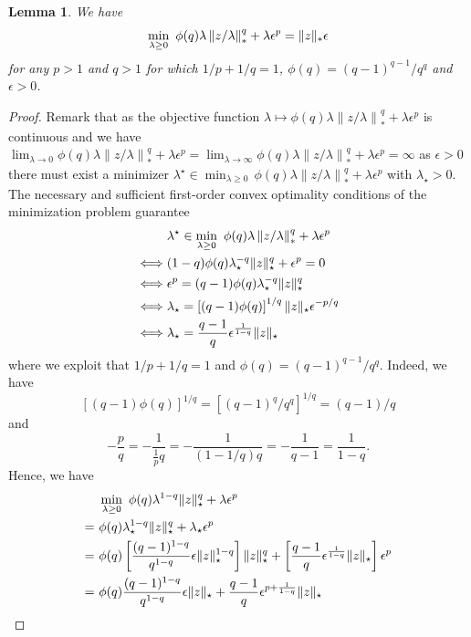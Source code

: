 \documentclass[12pt]{article}
\theoremstyle{thmstyleone}%
\newtheorem{lemma}[theorem]{Lemma}%
\theoremstyle{thmstyletwo}%
\theoremstyle{thmstylethree}%
\begin{document}
\begin{appendices}
\begin{lemma}
  \label{lemma:dual-helper}
  We have
  \[
    \min_{\lambda \geq 0} ~\phi(q)\lambda \left\|z/\lambda \right\|^q_* + \lambda \epsilon^p = \| z \|_*\epsilon
  \]
  for any $p>1$ and $q>1$ for which $1/p+1/q=1$, $\phi(q)=(q-1)^{q-1}/q^q$ and $\epsilon>0$.
\end{lemma}
\begin{proof}
  Remark that as the objective function $\lambda\mapsto \phi(q)\lambda \left\|z/\lambda \right\|^q_* + \lambda \epsilon^p$ is continuous and we have $\lim_{\lambda\to 0} \phi(q)\lambda \left\|z/\lambda \right\|^q_* + \lambda \epsilon^p = \lim_{\lambda\to\infty} \phi(q)\lambda \left\|z/\lambda \right\|^q_* + \lambda \epsilon^p=\infty$ as $\epsilon>0$ there must exist a minimizer $\lambda^\star\in \min_{\lambda \geq 0}\, \phi(q)\lambda \left\|z/\lambda \right\|^q_* + \lambda \epsilon^p$ with $\lambda_\star>0$.
The necessary and sufficient first-order convex optimality conditions of the minimization problem guarantee
\begin{align*}
  & \lambda^\star\in \min_{\lambda \geq 0} ~\phi(q)\lambda \left\|z/\lambda \right\|^q_* + \lambda \epsilon^p\\
  \iff & (1-q)\phi(q) \lambda_\star^{-q} \| z \|_\star^q + \epsilon^p = 0\\
  \iff & \epsilon^p = (q-1) \phi(q) \lambda_\star^{-q} \| z \|_\star^q \\
  \iff & \lambda_\star = \left[(q-1) \phi(q)\right]^{1/q} \| z \|_\star\epsilon^{-p/q}\\
  \iff & \lambda_\star = \frac{q-1}{q} \epsilon^{\frac{1}{1-q}} \| z \|_\star
\end{align*}
where we exploit that $1/p+1/q=1$ and $\phi(q)=(q-1)^{q-1}/q^q$. Indeed, we have
\[
  \left[(q-1) \phi(q)\right]^{1/q} = \left[(q-1)^{q}/q^q\right]^{1/q}= (q-1)/q
\]
and
\[
  -\frac{p}{q} = -\frac{1}{\frac{1}{p} q} = -\frac{1}{(1-1/q) q}=-\frac{1}{q-1}=\frac{1}{1-q}.
\]
Hence, we have
\begin{align*}
  & \min_{\lambda\geq 0} ~\phi(q) \lambda^{1-q} \norm{z}_\star^q+\lambda\epsilon^p\\
  = ~&\phi(q) \lambda_\star^{1-q} \norm{z}_\star^q+\lambda_\star\epsilon^p\\
  = ~&\phi(q) \left[ \frac{(q-1)^{1-q}}{q^{1-q}} \epsilon \norm{z}^{1-q}_\star \right] \norm{z}_\star^q +\left[\frac{q-1}{q} \epsilon^{\frac{1}{1-q}} \norm{z}_\star\right]\epsilon^p\\
  = ~&\phi(q) \frac{(q-1)^{1-q}}{q^{1-q}} \epsilon \norm{z}_\star +\frac{q-1}{q} \epsilon^{p+\frac{1}{1-q}} \norm{z}_\star\\

\end{align*}
\end{proof}
\end{appendices}
\end{document}

